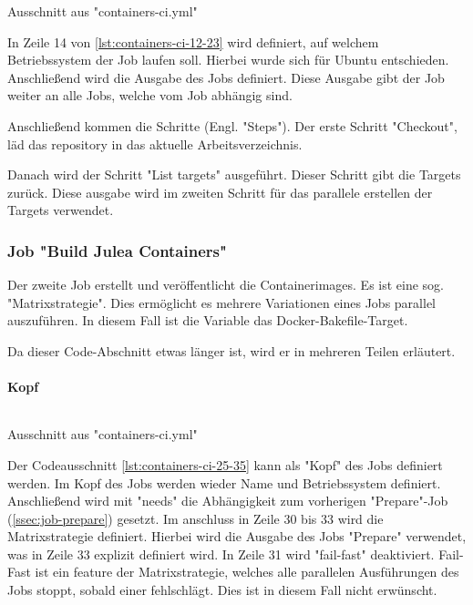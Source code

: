 \begin{listing}[H]
    \inputminted[firstline=12,lastline=23]{yaml}{./code-examples/containers-ci.yml}
    \caption{Ausschnitt aus "containers-ci.yml"}
    \label{lst:containers-ci-12-23}
\end{listing}

In Zeile 14 von \cref{lst:containers-ci-12-23} wird definiert, auf welchem Betriebssystem der Job laufen soll. Hierbei wurde sich für Ubuntu entschieden. 
Anschließend wird die Ausgabe des Jobs definiert. Diese Ausgabe gibt der Job weiter an alle Jobs, welche vom Job abhängig sind.

Anschließend kommen die Schritte (Engl. "Steps"). Der erste Schritt "Checkout", läd das repository in das aktuelle Arbeitsverzeichnis.

Danach wird der Schritt "List targets" ausgeführt. Dieser Schritt gibt die Targets zurück. Diese ausgabe wird im zweiten Schritt für das parallele erstellen der Targets verwendet.

\subsubsection{Job "Build Julea Containers"}

Der zweite Job erstellt und veröffentlicht die Containerimages. Es ist eine sog. "Matrixstrategie". Dies ermöglicht es mehrere Variationen eines Jobs parallel auszuführen. In diesem Fall ist die Variable das Docker-Bakefile-Target. 

Da dieser Code-Abschnitt etwas länger ist, wird er in mehreren Teilen erläutert.

\paragraph{Kopf}

\begin{listing}[H]
    \inputminted[firstline=25,lastline=35]{yaml}{./code-examples/containers-ci.yml}
    \caption{Ausschnitt aus "containers-ci.yml"}
    \label{lst:containers-ci-25-35}
\end{listing}

Der Codeausschnitt \cref{lst:containers-ci-25-35} kann als "Kopf" des Jobs definiert werden. Im Kopf des Jobs werden wieder Name und Betriebssystem definiert. Anschließend wird mit "needs" die Abhängigkeit zum vorherigen "Prepare"-Job (\cref{ssec:job-prepare}) gesetzt. Im anschluss in Zeile 30 bis 33 wird die Matrixstrategie definiert. Hierbei wird die Ausgabe des Jobs "Prepare" verwendet, was in Zeile 33 explizit definiert wird. In Zeile 31 wird "fail-fast" deaktiviert. Fail-Fast ist ein feature der Matrixstrategie, welches alle parallelen Ausführungen des Jobs stoppt, sobald einer fehlschlägt. Dies ist in diesem Fall nicht erwünscht.

